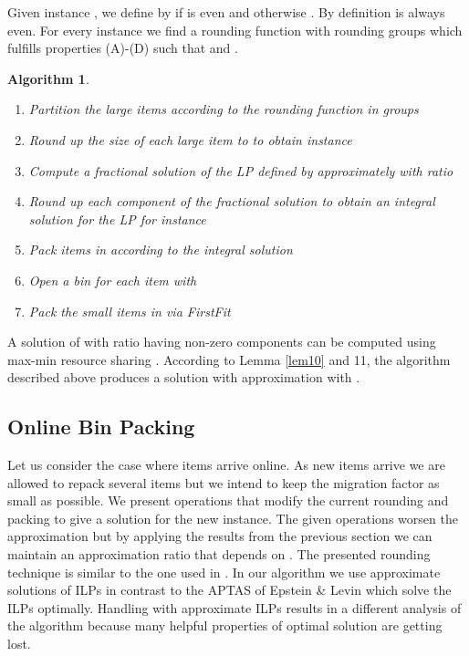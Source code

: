 \documentclass[a4paper,11pt]{article}
\newtheorem{algo}{Algorithm}
\begin{document}
Given instance , we define  by  if 
 is even and otherwise . By definition  is
always even.
For every instance  we find a rounding function 
with rounding groups  which fulfills properties (A)-(D) such that 
and .
\begin{algo}\label{alg6}
\   
\begin{enumerate}
\item Partition the large items according to the rounding function  in groups 
\item Round up the size of each large item  to  to obtain instance 
\item Compute a fractional solution  of the LP defined by  approximately with ratio 
\item Round up each component of the fractional solution to obtain an integral solution  for the LP for instance 
\item Pack items in  according to the integral solution 
\item Open a bin for each item  with 
\item Pack the small items in  via FirstFit
\end{enumerate}
\end{algo}
A solution  of  with ratio  having  non-zero components can be computed using
max-min resource sharing \cite{grigoriadis2001approximate}.
According to Lemma \ref{lem10} and 11, the algorithm described above produces a solution with approximation
 with .
\subsection{Online Bin Packing}
Let us consider the case where items arrive online. As new items arrive we are allowed to repack several items but
we intend to keep the migration factor as small as possible.
We present operations that modify the current rounding  and packing  to give a solution for
the new instance. The given operations worsen the approximation but by applying the results from the previous section
we can maintain an approximation ratio that depends on .
The presented rounding technique is similar to the one used in \cite{epstein2006robust}. 
In our algorithm we use approximate solutions of ILPs in contrast to the APTAS of Epstein \& Levin which solve
the ILPs optimally. Handling with approximate ILPs results in a different analysis of the algorithm because
many helpful properties of optimal solution are getting lost.
\end{document}
